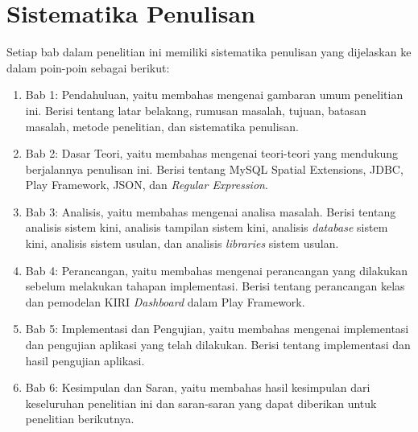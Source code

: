 \section{Sistematika Penulisan}
\label{sec:sistematika_penulisan}
Setiap bab dalam penelitian ini memiliki sistematika penulisan yang dijelaskan ke dalam poin-poin sebagai berikut:
	\begin{enumerate}
		\item Bab 1: Pendahuluan, yaitu membahas mengenai gambaran umum penelitian ini. Berisi tentang latar belakang, rumusan masalah, tujuan, batasan masalah, metode penelitian, dan sistematika penulisan.
		\item Bab 2: Dasar Teori, yaitu membahas mengenai teori-teori yang mendukung berjalannya penulisan ini. Berisi tentang MySQL Spatial Extensions, JDBC, Play Framework, JSON, dan \textit{Regular Expression}.
		\item Bab 3: Analisis, yaitu membahas mengenai analisa masalah. Berisi tentang analisis sistem kini, analisis tampilan sistem kini, analisis \textit{database} sistem kini, analisis sistem usulan, dan analisis \textit{libraries} sistem usulan.
		\item Bab 4: Perancangan, yaitu membahas mengenai perancangan yang dilakukan sebelum melakukan tahapan implementasi. Berisi tentang perancangan kelas dan pemodelan KIRI \textit{Dashboard} dalam Play Framework.
		\item Bab 5: Implementasi dan Pengujian, yaitu membahas mengenai implementasi dan pengujian aplikasi yang telah dilakukan. Berisi tentang implementasi dan hasil pengujian aplikasi.
		\item Bab 6: Kesimpulan dan Saran, yaitu membahas hasil kesimpulan dari keseluruhan penelitian ini dan saran-saran yang dapat diberikan untuk penelitian berikutnya.
	\end{enumerate}